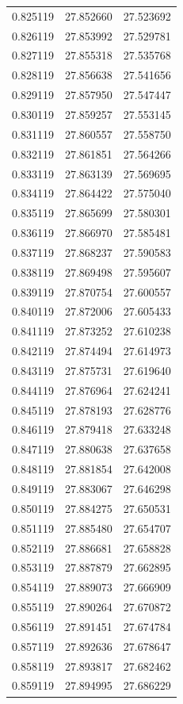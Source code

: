 \begin{tabular}{rrr}
0.825119 & 27.852660 & 27.523692 \\
0.826119 & 27.853992 & 27.529781 \\
0.827119 & 27.855318 & 27.535768 \\
0.828119 & 27.856638 & 27.541656 \\
0.829119 & 27.857950 & 27.547447 \\
0.830119 & 27.859257 & 27.553145 \\
0.831119 & 27.860557 & 27.558750 \\
0.832119 & 27.861851 & 27.564266 \\
0.833119 & 27.863139 & 27.569695 \\
0.834119 & 27.864422 & 27.575040 \\
0.835119 & 27.865699 & 27.580301 \\
0.836119 & 27.866970 & 27.585481 \\
0.837119 & 27.868237 & 27.590583 \\
0.838119 & 27.869498 & 27.595607 \\
0.839119 & 27.870754 & 27.600557 \\
0.840119 & 27.872006 & 27.605433 \\
0.841119 & 27.873252 & 27.610238 \\
0.842119 & 27.874494 & 27.614973 \\
0.843119 & 27.875731 & 27.619640 \\
0.844119 & 27.876964 & 27.624241 \\
0.845119 & 27.878193 & 27.628776 \\
0.846119 & 27.879418 & 27.633248 \\
0.847119 & 27.880638 & 27.637658 \\
0.848119 & 27.881854 & 27.642008 \\
0.849119 & 27.883067 & 27.646298 \\
0.850119 & 27.884275 & 27.650531 \\
0.851119 & 27.885480 & 27.654707 \\
0.852119 & 27.886681 & 27.658828 \\
0.853119 & 27.887879 & 27.662895 \\
0.854119 & 27.889073 & 27.666909 \\
0.855119 & 27.890264 & 27.670872 \\
0.856119 & 27.891451 & 27.674784 \\
0.857119 & 27.892636 & 27.678647 \\
0.858119 & 27.893817 & 27.682462 \\
0.859119 & 27.894995 & 27.686229 \\

\end{tabular}

